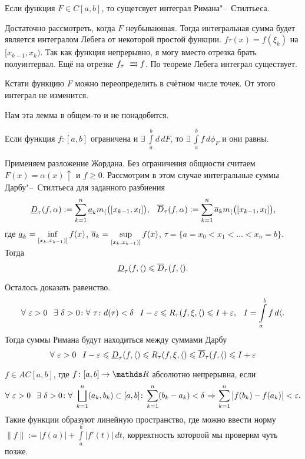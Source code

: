 \begin{Lem}
  Если функция $F\in C[a,b]$, то сущетсвует интеграл Римана"--~Стилтьеса.
\end{Lem}
\begin{Proof}
  Достаточно рассмотреть, когда $F$ неубываюшая. Тогда интегральная сумма будет является интегралом Лебега от некоторой простой функции. $f\tau(x) = f(\xi_k)$ на $[x_{k-1},x_k)$. Так как функция непрерывно, я могу вместо отрезка брать полуинтервал. Ещё на отрезке $f_\tau\rsH[]{}f$. По теореме Лебега интеграл существует.
\end{Proof}

Кстати функцию $F$ можно переопределить в счётном числе точек. От этого интеграл не изменится.

Нам  эта лемма в общем-то и не понадобится.
\begin{The}
  Если функция $f\colon [a,b]$ ограничена и $\exists\ \int\limits_a^bd\,dF$, то $\exists\ \int\limits_a^b f\,d\phi_F$ и они равны.
\end{The}
\begin{Proof}
  Применяем разложение Жордана. Без ограничения общности считаем $F(x)= \alpha(x)\uparrow$ и $f\ge 0$. Рассмотрим в этом случае интегральные суммы Дарбу"--~Стилтьеса для заданного разбиения
\[
  \underline D_\tau(f,\alpha):=\sum\limits_{k = 1}^{n} \underline a_k m_\langle\big([x_{k-1},x_l]\big),\hskip .75em plus.1em minus.08em\relax \overline{D}_\tau(f,\alpha):=\sum\limits_{k = 1}^{n} \overline{a}_k m_\langle\big([x_{k-1},x_l]\big),
\]
где $\underline a_k = \inf\limits_{[x_k,x_{k-1})]} f(x)$, $\overline{a}_k = \sup\limits_{[x_k,x_{k-1})]} f(x)$, $\tau = \{a=x_0<x_1<\dots<x_n=b\}$. Тогда
\[
 \underline D_\tau(f,\langle)\leqslant \overline{D}_\tau(f,\langle).
\]

Осталось доказать равенство.
\[
  \forall\ \e>0\pau \exists\ \delta>0\colon \forall\ \tau\colon d(\tau)<\delta\pau I-\e\le R_\tau(f,\xi,\a)\le I+\e,
  \pau I = \int\limits_a^bf\,d\a.
\]
Тогда суммы Римана будут находиться между суммами Дарбу
\[
  \forall\ \e>0\pau I-\e\le \ul D_\tau(f,\a)\le R_\tau(f,\xi,\a)\le\ol D_\tau(f,\a) \le I+\e
\]
\end{Proof}

\begin{Def}
  $f\in AC[a,b]$, где $f\colon [a,b]\to\R$ абсолютно непрерывна, если
  \[
   \forall\ \e>0\pau\exists\ \d>0\colon \forall\ \DUN k1n(a_k,b_k)\subset [a,b]\colon \RY k1n(b_k-a_k)<\d\imp\RY k1n\big|f(b_k)-f(a_k)\big|<\e.
\]
Такие функции образуют линейную пространство, где можно ввести норму $\|f\|:=\big|f(a)\big|+\int\limits_a^b\big|f'(t)\big|\,d t$, корректность котороой мы проверим чуть позже.
\end{Def}

